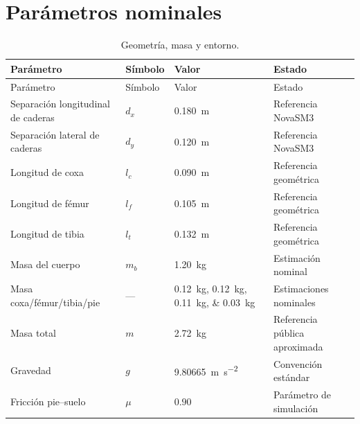 \documentclass[11pt,letterpaper]{article}
\begin{document}
\section{Parámetros nominales}
\begin{longtable}{p{4.6cm}p{1.7cm}p{2.8cm}p{5.3cm}}
\caption{Geometría, masa y entorno.}\label{tab:param}\\
\toprule Parámetro & Símbolo & Valor & Estado \\ \midrule\endfirsthead
\toprule Parámetro & Símbolo & Valor & Estado \\ \midrule\endhead
Separación longitudinal de caderas & $d_x$ & \SI{0.180}{m} & Referencia NovaSM3\\
Separación lateral de caderas & $d_y$ & \SI{0.120}{m} & Referencia NovaSM3\\
Longitud de coxa & $l_c$ & \SI{0.090}{m} & Referencia geométrica\\
Longitud de fémur & $l_f$ & \SI{0.105}{m} & Referencia geométrica\\
Longitud de tibia & $l_t$ & \SI{0.132}{m} & Referencia geométrica\\
Masa del cuerpo & $m_b$ & \SI{1.20}{kg} & Estimación nominal\\
Masa coxa/fémur/tibia/pie & --- & \SIlist{0.12;0.12;0.11;0.03}{kg} & Estimaciones nominales\\
Masa total & $m$ & \SI{2.72}{kg} & Referencia pública aproximada\\
Gravedad & $g$ & \SI{9.80665}{m.s^{-2}} & Convención estándar\\
Fricción pie--suelo & $\mu$ & $0.90$ & Parámetro de simulación\\ \bottomrule
\end{longtable}
\end{document}
